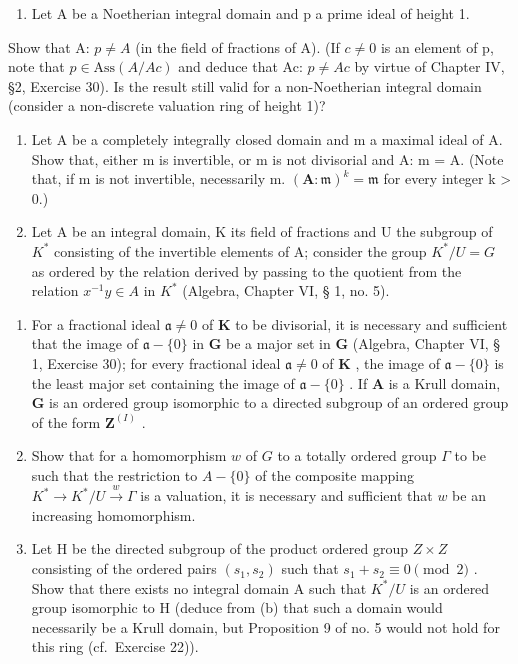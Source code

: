 \begin{enumerate}
\def\labelenumi{\arabic{enumi}.}
\setcounter{enumi}{2}
\tightlist
\item
  Let A be a Noetherian integral domain and p a prime ideal of height 1.
\end{enumerate}

Show that A: \(p \neq A\) (in the field of fractions of A). (If \(c \neq 0\) is an element of p, note that \(p \in \text{Ass}(A/Ac)\) and deduce that Ac: \(p \neq Ac\) by virtue of Chapter IV, §2, Exercise 30). Is the result still valid for a non-Noetherian integral domain (consider a non-discrete valuation ring of height 1)?

\begin{enumerate}
\def\labelenumi{\arabic{enumi}.}
\setcounter{enumi}{3}
\item
  Let A be a completely integrally closed domain and m a maximal ideal of A. Show that, either m is invertible, or m is not divisorial and A: m = A. (Note that, if m is not invertible, necessarily m. \((\mathbf{A}:\mathfrak{m})^{k} = \mathfrak{m}\) for every integer k \textgreater{} 0.)
\item
  Let A be an integral domain, K its field of fractions and U the subgroup of \(K^{*}\) consisting of the invertible elements of A; consider the group \(K^{*}/U = G\) as ordered by the relation derived by passing to the quotient from the relation \(x^{-1}y \in A\) in \(K^{*}\) (Algebra, Chapter VI, § 1, no. 5).
\end{enumerate}

\begin{enumerate}
\def\labelenumi{(\alph{enumi})}
\item
  For a fractional ideal \(\mathfrak{a} \neq 0\) of \(\mathbf{K}\) to be divisorial, it is necessary and sufficient that the image of \(\mathfrak{a} - \{0\}\) in \(\mathbf{G}\) be a major set in \(\mathbf{G}\) (Algebra, Chapter VI, § 1, Exercise 30); for every fractional ideal \(\mathfrak{a} \neq 0\) of \(\mathbf{K}\) , the image of \(\mathfrak{a} - \{0\}\) is the least major set containing the image of \(\mathfrak{a} - \{0\}\) . If \(\mathbf{A}\) is a Krull domain, \(\mathbf{G}\) is an ordered group isomorphic to a directed subgroup of an ordered group of the form \(\mathbf{Z}^{(I)}\) .
\item
  Show that for a homomorphism \(w\) of \(G\) to a totally ordered group \(\Gamma\) to be such that the restriction to \(A - \{0\}\) of the composite mapping \(K^* \to K^*/U \xrightarrow{w} \Gamma\) is a valuation, it is necessary and sufficient that \(w\) be an increasing homomorphism.
\item
  Let H be the directed subgroup of the product ordered group \(Z \times Z\) consisting of the ordered pairs \((s_{1}, s_{2})\) such that \(s_{1} + s_{2} \equiv 0 \pmod{2}\) . Show that there exists no integral domain A such that \(K^{*}/U\) is an ordered group isomorphic to H (deduce from (b) that such a domain would necessarily be a Krull domain, but Proposition 9 of no. 5 would not hold for this ring (cf.~Exercise 22)).
\end{enumerate}

